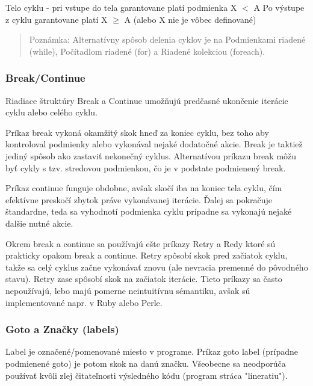 \documentclass[a4paper,10pt]{article}
\begin{document}
\begin{multicols}{2}
		\begin{algorithm}
			\begin{algorithmic}[1]
					
					\State Telo cyklu - pri vstupe do tela garantovane platí podmienka X $<$ A
				\EndFor
				\State Po výstupe z cyklu garantovane platí X $\geq$ A (alebo X nie je vôbec definované)
			\end{algorithmic}	
		\end{algorithm}	
		
		\begin{quote}
			Poznámka: Alternatívny spôsob delenia cyklov je na Podmienkami riadené (while), Počítadlom riadené (for) a Riadené kolekciou (foreach).
		\end{quote}
		
	\subsubsection{Break/Continue}

		Riadiace štruktúry Break a Continue umožňujú predčasné ukončenie iterácie cyklu alebo celého cyklu.
		
		Príkaz break vykoná okamžitý skok hneď za koniec cyklu, bez toho aby kontroloval podmienky alebo vykonával nejaké dodatočné akcie. Break je taktiež jediný spôsob ako zastaviť nekonečný cyklus. Alternatívou príkazu break môžu byť cykly s tzv. stredovou podmienkou, čo je v podstate podmienený break.
		
		Príkaz continue funguje obdobne, avšak skočí iba na koniec tela cyklu, čím efektívne preskočí zbytok práve vykonávanej iterácie. Ďalej sa pokračuje štandardne, teda sa vyhodnotí podmienka cyklu prípadne sa vykonajú nejaké ďalšie nutné akcie.
		
		Okrem break a continue sa používajú ešte príkazy Retry a Redy ktoré sú prakticky opakom break a continue. Retry spôsobí skok pred začiatok cyklu, takže sa celý cyklus začne vykonávať znovu (ale nevracia premenné do pôvodného stavu). Retry zase spôsobí skok na začiatok iterácie. Tieto príkazy sa často nepoužívajú, lebo majú pomerne neintuitívnu sémantiku, avšak sú implementované napr. v Ruby alebo Perle.

	\subsubsection{Goto a Značky (labels)}

		Label je označené/pomenované miesto v programe. Príkaz goto label (prípadne podmienené goto) je potom skok na danú značku. Všeobecne sa neodporúča používať kvôli zlej čitateľnosti výsledného kódu (program stráca "lineratiu").
		

\end{multicols}
\end{document}
